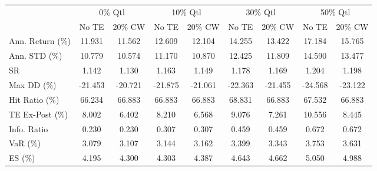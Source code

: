 \begin{tabular}{lcccccccc}
\toprule
{} & \multicolumn{2}{c}{0\% Qtl} & \multicolumn{2}{c}{10\% Qtl} & \multicolumn{2}{c}{30\% Qtl} & \multicolumn{2}{c}{50\% Qtl} \\
{} &   No TE &  20\% CW &   No TE &  20\% CW &   No TE &  20\% CW &   No TE &  20\% CW \\
\midrule
Ann. Return (\%) &  11.931 &  11.562 &  12.609 &  12.104 &  14.255 &  13.422 &  17.184 &  15.765 \\
Ann. STD (\%)    &  10.779 &  10.574 &  11.170 &  10.870 &  12.425 &  11.809 &  14.590 &  13.477 \\
SR              &   1.142 &   1.130 &   1.163 &   1.149 &   1.178 &   1.169 &   1.204 &   1.198 \\
Max DD (\%)      & -21.453 & -20.721 & -21.875 & -21.061 & -22.363 & -21.455 & -24.568 & -23.122 \\
Hit Ratio (\%)   &  66.234 &  66.883 &  66.883 &  66.883 &  68.831 &  66.883 &  67.532 &  66.883 \\
TE Ex-Post (\%)  &   8.002 &   6.402 &   8.210 &   6.568 &   9.076 &   7.261 &  10.556 &   8.445 \\
Info. Ratio     &   0.230 &   0.230 &   0.307 &   0.307 &   0.459 &   0.459 &   0.672 &   0.672 \\
VaR (\%)         &   3.079 &   3.107 &   3.144 &   3.162 &   3.399 &   3.343 &   3.753 &   3.631 \\
ES (\%)          &   4.195 &   4.300 &   4.303 &   4.387 &   4.643 &   4.662 &   5.050 &   4.988 \\
\bottomrule
\end{tabular}

